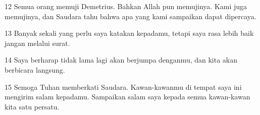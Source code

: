 \par 12 Semua orang memuji Demetrius. Bahkan Allah pun memujinya. Kami juga memujinya, dan Saudara tahu bahwa apa yang kami sampaikan dapat dipercaya.
\par 13 Banyak sekali yang perlu saya katakan kepadamu, tetapi saya rasa lebih baik jangan melalui surat.
\par 14 Saya berharap tidak lama lagi akan berjumpa denganmu, dan kita akan berbicara langsung.
\par 15 Semoga Tuhan memberkati Saudara. Kawan-kawanmu di tempat saya ini mengirim salam kepadamu. Sampaikan salam saya kepada semua kawan-kawan kita satu persatu.


